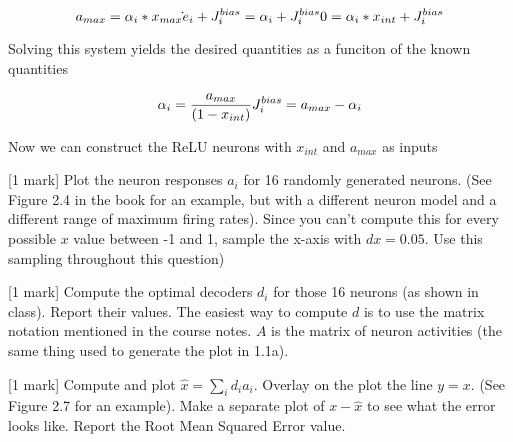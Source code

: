 \documentclass{article}
\begin{document}
\[
a_{max} = \alpha_i * x_{max} \dot{} e_i + J_i^{bias} = \alpha_i + J_i^{bias} \\
0 = \alpha_i * x_{int} + J_i^{bias}
\]

Solving this system yields the desired quantities as a funciton of the
known quantities

\[
\alpha_i = {a_{max} \over {(1-x_{int})}} \\
J_i^{bias} = a_{max} - \alpha_i
\]

Now we can construct the ReLU neurons with $x_{int}$ and $a_{max}$ as
inputs

    {[}1 mark{]} Plot the neuron responses $a_i$ for 16 randomly generated
neurons. (See Figure 2.4 in the book for an example, but with a
different neuron model and a different range of maximum firing rates).
Since you can't compute this for every possible $x$ value between -1 and
1, sample the x-axis with $dx=0.05$. Use this sampling throughout this
question)

{[}1 mark{]} Compute the optimal decoders $d_i$ for those 16 neurons (as
shown in class). Report their values. The easiest way to compute $d$ is
to use the matrix notation mentioned in the course notes. $A$ is the
matrix of neuron activities (the same thing used to generate the plot in
1.1a).

{[}1 mark{]} Compute and plot $\hat{x}=\sum_i d_i a_i$. Overlay on the
plot the line $y=x$. (See Figure 2.7 for an example). Make a separate
plot of $x-\hat{x}$ to see what the error looks like. Report the Root
Mean Squared Error value.
\end{document}
